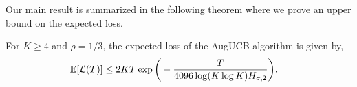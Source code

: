 %


Our main result is summarized in the following theorem where we prove an  upper bound on the expected loss. 
\begin{theorem}
\label{Result:Theorem:1}
For $K\geq 4$ and
$\rho={1}/{3}$,
the expected loss of the AugUCB algorithm is given by,
\begin{align*}
\mathbb{E}[\mathcal{L}(T)]
& \leq 2KT
 \exp\bigg(- \frac{T}{4096 \log( K\log K) H_{\sigma,2}} \bigg).
\end{align*}
\end{theorem}

